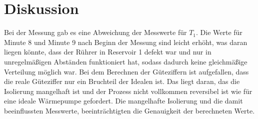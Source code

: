 \newpage
\section{Diskussion}
\label{sec:Diskussion}
Bei der Messung gab es eine Abweichung der Messwerte für $T_1$. Die Werte für
Minute 8 und Minute 9 nach Beginn der Messung sind leicht erhöht, was daran
liegen könnte, dass der Rührer in Reservoir 1 defekt war und nur in unregelmäßigen
Abständen funktioniert hat, sodass dadurch keine gleichmäßige Verteilung möglich war.
Bei dem Berechnen der Güteziffern ist aufgefallen, dass die reale Güteziffer nur
ein Bruchteil der Idealen ist. Das liegt daran, das die Isolierung mangelhaft ist
und der Prozess nicht vollkommen reversibel ist wie für eine ideale Wärmepumpe
gefordert. Die mangelhafte Isolierung und die damit beeinflussten Messwerte,
beeinträchtigten die Genauigkeit der berechneten Werte.
